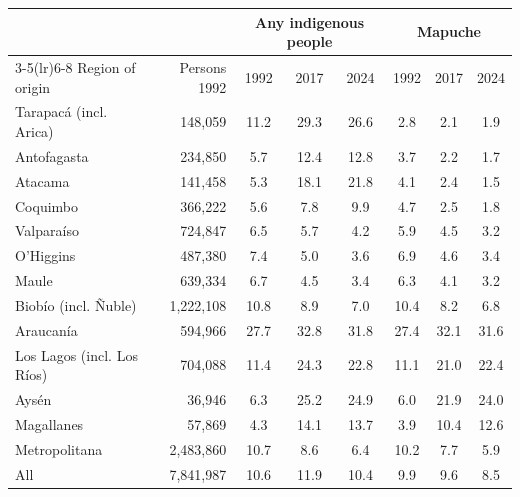 \begin{tabular}{lrcccccc}
\toprule
 & & \multicolumn{3}{c}{Any indigenous people} & \multicolumn{3}{c}{Mapuche} \\
\cmidrule(lr){3-5}\cmidrule(lr){6-8}
Region of origin & Persons 1992 & 1992 & 2017 & 2024 & 1992 & 2017 & 2024 \\
\midrule
Tarapac\'a (incl. Arica) & 148,059 & 11.2 & 29.3 & 26.6 & 2.8 & 2.1 & 1.9 \\
Antofagasta & 234,850 & 5.7 & 12.4 & 12.8 & 3.7 & 2.2 & 1.7 \\
Atacama & 141,458 & 5.3 & 18.1 & 21.8 & 4.1 & 2.4 & 1.5 \\
Coquimbo & 366,222 & 5.6 & 7.8 & 9.9 & 4.7 & 2.5 & 1.8 \\
Valpara\'iso & 724,847 & 6.5 & 5.7 & 4.2 & 5.9 & 4.5 & 3.2 \\
O'Higgins & 487,380 & 7.4 & 5.0 & 3.6 & 6.9 & 4.6 & 3.4 \\
Maule & 639,334 & 6.7 & 4.5 & 3.4 & 6.3 & 4.1 & 3.2 \\
Biob\'io (incl. \~Nuble) & 1,222,108 & 10.8 & 8.9 & 7.0 & 10.4 & 8.2 & 6.8 \\
Araucan\'ia & 594,966 & 27.7 & 32.8 & 31.8 & 27.4 & 32.1 & 31.6 \\
Los Lagos (incl. Los R\'ios) & 704,088 & 11.4 & 24.3 & 22.8 & 11.1 & 21.0 & 22.4 \\
Ays\'en & 36,946 & 6.3 & 25.2 & 24.9 & 6.0 & 21.9 & 24.0 \\
Magallanes & 57,869 & 4.3 & 14.1 & 13.7 & 3.9 & 10.4 & 12.6 \\
Metropolitana & 2,483,860 & 10.7 & 8.6 & 6.4 & 10.2 & 7.7 & 5.9 \\
All & 7,841,987 & 10.6 & 11.9 & 10.4 & 9.9 & 9.6 & 8.5 \\
\bottomrule
\end{tabular}
